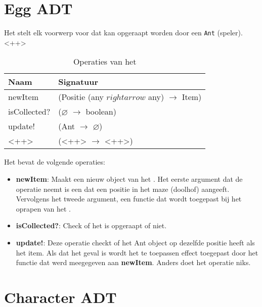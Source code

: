 \section{Egg ADT}
\label{section:egg}

Het \texttt{} stelt elk voorwerp voor dat kan opgeraapt  worden door een \texttt{Ant} (speler).
<++>

\begin{table}[hbt]
\centering
\begin{tabular}{|ll|}
\hline
\rowcolor[HTML]{000000} 
{\color[HTML]{FFFFFF} \textbf{Naam}} & {\color[HTML]{FFFFFF} \textbf{Signatuur}} \\ \hline
newItem                              & (Positie (any $rightarrow$ any) $\rightarrow$ Item) \\ \hline
isCollected?                         & ($\varnothing$ $\rightarrow$ boolean)               \\ \hline
update!                              & (Ant $\rightarrow$ $\varnothing$)                   \\ \hline
 <++>                                & (<++> $\rightarrow$ <++>)                           \\ \hline
\end{tabular}
\caption{Operaties van het \texttt{}}
\label{table:item}
\end{table}

Het \texttt{} bevat de volgende operaties:

\begin{itemize}
	\item \textbf{newItem}: Maakt een nieuw object van het \texttt{}.
		Het eerste argument dat de operatie neemt is een \texttt{} dat een positie in het maze (doolhof) aangeeft.
		Vervolgens het tweede argument, een functie dat wordt toegepast bij het oprapen van het \texttt{}.
	\item \textbf{isCollected?}: Check of het \texttt{} is opgeraapt of niet.
	\item \textbf{update!}: Deze operatie checkt of het Ant object op dezelfde positie heeft als het item.
		Als dat het geval is wordt het te toepassen effect toegepast door het functie dat werd meegegeven aan \textbf{newItem}.
		Anders doet het operatie niks.
\end{itemize}

\section{Character ADT}
\label{section:character}

